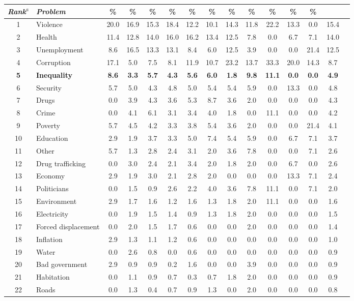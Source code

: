 \documentclass[12pt,a4paper]{article}
\begin{document}
\begin{sidewaystable}
\begin{tabular}{cl *{13}{c} }
\textbf{\textit{Rank$^{a}$}}&\textbf{\textit{Problem}}&\%&\%&\%&\%&\%&\%&\%&\%&\%&\%&\%\\
\midrule
1	&	Violence&20.0&16.9&15.3&18.4&12.2&10.1&14.3&11.8&22.2&13.3&0.0&15.4 \\
2	&	Health&11.4&12.8&14.0&16.0&16.2&13.4&12.5&7.8&0.0&6.7&7.1&14.0 \\
3	&	Unemployment&8.6&16.5&13.3&13.1&8.4&6.0&12.5&3.9&0.0&0.0&21.4&12.5 \\
4	&	Corruption&17.1&5.0&7.5&8.1&11.9&10.7&23.2&13.7&33.3&20.0&14.3&8.7 \\
\textbf{5}	&	\textbf{Inequality}&\textbf{8.6}&\textbf{3.3}&\textbf{5.7}&\textbf{4.3}&\textbf{5.6}&\textbf{6.0}&\textbf{1.8}&\textbf{9.8}&\textbf{11.1}&\textbf{0.0}&\textbf{0.0}&\textbf{4.9} \\
6	&	Security&5.7&5.0&4.3&4.8&5.0&5.4&5.4&5.9&0.0&13.3&0.0&4.8 \\
7	&	Drugs&0.0&3.9&4.3&3.6&5.3&8.7&3.6&2.0&0.0&0.0&0.0&4.3 \\
8	&	Crime&0.0&4.1&6.1&3.1&3.4&4.0&1.8&0.0&11.1&0.0&0.0&4.2 \\
9	&	Poverty&5.7&4.5&4.2&3.3&3.8&5.4&3.6&2.0&0.0&0.0&21.4&4.1 \\
10	&	Education&2.9&1.9&3.7&3.3&5.0&7.4&5.4&5.9&0.0&6.7&7.1&3.7 \\
11	&	Other&5.7&1.3&2.8&2.4&3.1&2.0&3.6&7.8&0.0&0.0&7.1&2.6 \\
12	&	Drug trafficking&0.0&3.0&2.4&2.1&3.4&2.0&1.8&2.0&0.0&6.7&0.0&2.6 \\
13	&	Economy&2.9&1.9&3.0&2.1&2.8&2.0&0.0&0.0&0.0&13.3&7.1&2.4 \\
14	&	Politicians&0.0&1.5&0.9&2.6&2.2&4.0&3.6&7.8&11.1&0.0&7.1&2.0 \\
15	&	Environment&2.9&1.7&1.6&1.2&1.6&1.3&1.8&2.0&11.1&0.0&0.0&1.6 \\
16	&	Electricity&0.0&1.9&1.5&1.4&0.9&1.3&1.8&2.0&0.0&0.0&0.0&1.5 \\
17	&	Forced displacement&0.0&2.0&1.5&1.7&0.6&0.0&0.0&2.0&0.0&0.0&0.0&1.4 \\
18	&	Inflation&2.9&1.3&1.1&1.2&0.6&0.0&0.0&0.0&0.0&0.0&0.0&1.0 \\
19	&	Water&0.0&2.6&0.8&0.0&0.6&0.0&0.0&0.0&0.0&0.0&0.0&0.9 \\
20	&	Bad government&2.9&0.9&0.9&0.2&1.6&0.0&0.0&3.9&0.0&0.0&0.0&0.9 \\
21	&	Habitation&0.0&1.1&0.9&0.7&0.3&0.7&1.8&2.0&0.0&0.0&0.0&0.9 \\
22	&	Roads&0.0&1.3&0.4&0.7&0.9&1.3&0.0&2.0&0.0&0.0&0.0&0.8 \\

\end{tabular}
\end{sidewaystable}
\end{document}
